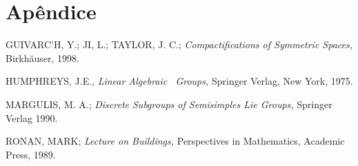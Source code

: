 \documentclass[twoside,openright,titlepage,numbers=noenddot,headinclude,  lineheaders footinclude=true,cleardoublepage=empty,
                                BCOR=5mm,paper=a4,fontsize=12pt ]{scrbook}
\begin{document}


\backmatter
\appendix
\chapter{Ap\^endice}





\begin{thebibliography}{9999}  
GUIVARC'H, Y.; JI, L.; TAYLOR, J. C.;
\emph{Compactifications of Symmetric Spaces, }Birkh\"{a}user, 1998.

HUMPHREYS, J.E., \emph{Linear Algebraic \ Groups, }Springer
Verlag, New York, 1975.

MARGULIS, M. A.; \emph{Discrete Subgroups of Semisimples
Lie Groups, }Springer Verlag 1990.

RONAN, MARK; \emph{Lecture on Buildings, }Perspectives in
Mathematics, Academic Press, 1989.
\end{thebibliography}



\clearpage
{}
{}
\printindex
\end{document}
